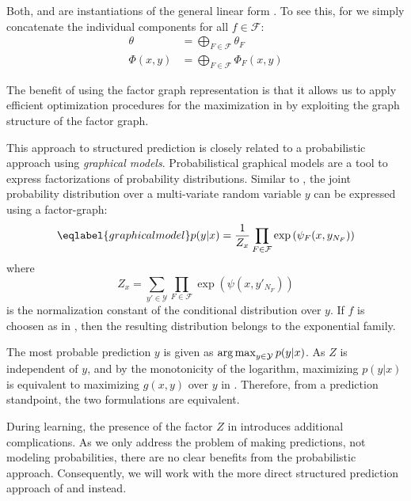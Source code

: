 Both,  and  are instantiations of the general
linear form . To see this, for  we simply
concatenate the individual components for all $f \in \mathcal{F}$:
\begin{align}
    \theta &= \bigoplus_{F \in \mathcal{F}} \theta_F\\
    \Phi(x, y) &= \bigoplus_{F \in \mathcal{F}} \Phi_F(x, y)
\end{align}

The benefit of using the factor graph representation is that it allows us to
apply efficient optimization procedures for the maximization in
 by exploiting the graph structure of the factor graph.

This approach to structured prediction is closely related to a probabilistic
approach using \emph{graphical models}.  Probabilistical graphical models are a
tool to express factorizations of probability distributions.  Similar to
, the joint probability distribution over a
multi-variate random variable $y$ can be expressed using a factor-graph:
\begin{equation}\eqlabel{graphicalmodel}
    p(y | x) = \frac{1}{Z_x}\prod_{F \in \mathcal{F}} \exp\left(\psi_F(x, y_{N_F})\right)
\end{equation}
where
\begin{equation}
    Z_x = \sum_{y' \in \mathcal{Y}} \prod_{F \in \mathcal{F}} \exp\left(\psi(x, y'_{N_F})\right)
\end{equation}
is the normalization constant of the conditional distribution over $y$.
If $f$ is choosen as in , then the resulting distribution
belongs to the exponential family.

The most probable prediction $y$ is given as $\operatorname*{arg\,max}_{y \in \mathcal{Y}}p(y|x)$.
As $Z$ is independent of $y$, and by the monotonicity of the logarithm,
maximizing $p(y|x)$ is equivalent to maximizing $g(x,y)$ over $y$ in
. Therefore, from a prediction standpoint, the two
formulations are equivalent.

During learning, the presence of the factor $Z$ in 
introduces additional complications. As we only address the problem of making
predictions, not modeling probabilities, there are no clear benefits from the
probabilistic approach.  Consequently, we will work with the more direct
structured prediction approach of  and
 instead.

